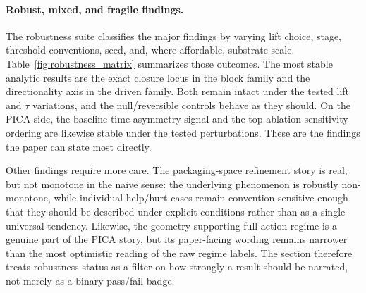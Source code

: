 \documentclass[11pt]{article}
\theoremstyle{definition}
\begin{document}
\paragraph{Robust, mixed, and fragile findings.}
The robustness suite classifies the major findings by varying lift choice, stage, threshold conventions, seed, and, where affordable, substrate scale. Table~\ref{fig:robustness_matrix} summarizes those outcomes. The most stable analytic results are the exact closure locus in the block family and the directionality axis in the driven family. Both remain intact under the tested lift and $\tau$ variations, and the null/reversible controls behave as they should. On the PICA side, the baseline time-asymmetry signal and the top ablation sensitivity ordering are likewise stable under the tested perturbations. These are the findings the paper can state most directly.

Other findings require more care. The packaging-space refinement story is real, but not monotone in the naive sense: the underlying phenomenon is robustly non-monotone, while individual help/hurt cases remain convention-sensitive enough that they should be described under explicit conditions rather than as a single universal tendency. Likewise, the geometry-supporting full-action regime is a genuine part of the PICA story, but its paper-facing wording remains narrower than the most optimistic reading of the raw regime labels. The section therefore treats robustness status as a filter on how strongly a result should be narrated, not merely as a binary pass/fail badge.
\end{document}
